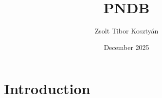 \documentclass{article}
\title{PNDB}
\author{Zsolt Tibor Kosztyán}
\date{December 2025}
\begin{document}
\maketitle

\section{Introduction}
\end{document}
